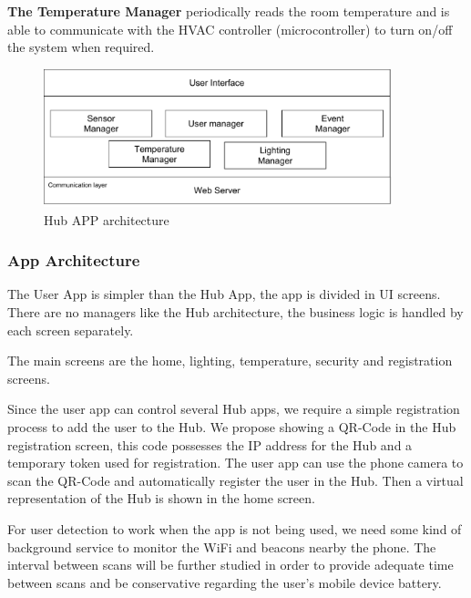 \documentclass[conference]{IEEEtran}
\begin{document}
\textbf{The Temperature Manager} periodically reads the room temperature and is able to communicate with the \ac{HVAC} controller (microcontroller) to turn on/off the system when required.


\begin{figure}[h]
\centering
\includegraphics[width=0.9\textwidth]{Figures/software_hub}
\caption{Hub APP architecture }
\label{software2}
\end{figure}



\subsubsection{App Architecture}
The User App is simpler than the Hub App, the app is divided in \ac{UI} screens. There are no managers like the Hub architecture, the business logic is handled by each screen separately. 


The main screens are the home, lighting, temperature, security and registration screens.

Since the user app can control several Hub apps, we require a simple registration process to add the user to the Hub. We propose showing a QR-Code in the Hub registration screen, this code possesses the \ac{IP} address for the Hub and a temporary token used for registration. The user app can use the phone camera to scan the QR-Code and automatically register the user in the Hub. Then a virtual representation of the Hub is shown in the home screen.

For user detection to work when the app is not being used, we need some kind of background service to monitor the \ac{WiFi} and beacons nearby the phone. The interval between scans will be further studied in order to provide adequate time between scans and be conservative regarding the user's mobile device battery.
\end{document}
